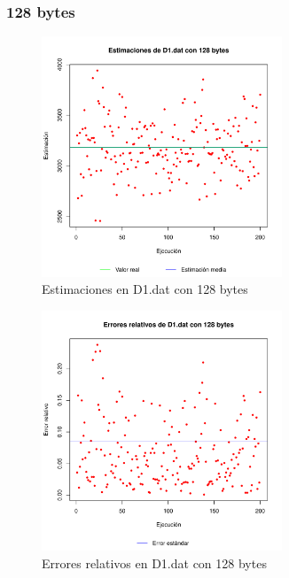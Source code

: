\subsubsection{128 bytes}
\begin{figure}[h!]
    \centering
        \includegraphics[width=0.64\textwidth]{../figs/D1/plot_estimation_128.pdf}
        \caption{Estimaciones en D1.dat con 128 bytes}
    \label{figura:D1_estimation_128}
\end{figure}

\begin{figure}[h!]
    \centering
        \includegraphics[width=0.64\textwidth]{../figs/D1/plot_errors_128.pdf}
        \caption{Errores relativos en D1.dat con 128 bytes}
    \label{figura:D1_errors_128}
\end{figure}

